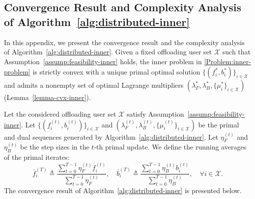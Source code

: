 \documentclass[lettersize,journal]{IEEEtran}
\begin{document}
\subsection{Convergence Result and Complexity Analysis of Algorithm~\ref{alg:distributed-inner}}
\label{proof:convergence-complexity-alg-inner}

In this appendix, we present the convergence result and the complexity analysis of Algorithm~\ref{alg:distributed-inner}.
Given a fixed offloading user set $\mathcal{X}$ such that Assumption~\ref{assump:feasibility-inner} holds, the inner problem
in \eqref{Problem:inner-problem} is strictly convex with a unique primal optimal solution
$\{(f_i^*,b_i^*)\}_{i\in\mathcal{X}}$ and admits a nonempty set of optimal Lagrange multipliers
$(\lambda_F^*,\lambda_B^*,\{\mu_i^*\}_{i\in\mathcal{X}})$ (Lemma~\ref{lemma-cvx-inner}).

Let the considered offloading user set $\mathcal{X}$ satisfy Assumption~\ref{assump:feasibility-inner}. Let $\{(f_i^{(t)},b_i^{(t)})\}_{i\in\mathcal{X}}$ and $(\lambda_F^{(t)},\lambda_B^{(t)},\{\mu_i^{(t)}\}_{i\in\mathcal{X}})$
be the primal and dual sequences generated by Algorithm~\ref{alg:distributed-inner}. Let $\eta_F^{(t)}$ and $\eta_B^{(t)}$ be the step sizes in the $t$-th primal update.
We define the running averages of the primal iterates:
\begin{equation}
\label{eq:running_avg_primal}
\bar f_i^{(T)} \triangleq \frac{\sum_{t=0}^{T-1}\eta_F^{(t)} f_i^{(t)}}{\sum_{t=0}^{T-1}\eta_F^{(t)}},\quad
\bar b_i^{(T)} \triangleq \frac{\sum_{t=0}^{T-1}\eta_B^{(t)} b_i^{(t)}}{\sum_{t=0}^{T-1}\eta_B^{(t)}},\quad \forall i\in\mathcal{X}.
\end{equation}
The convergence result of Algorithm~\ref{alg:distributed-inner} is presented below.
\end{document}
